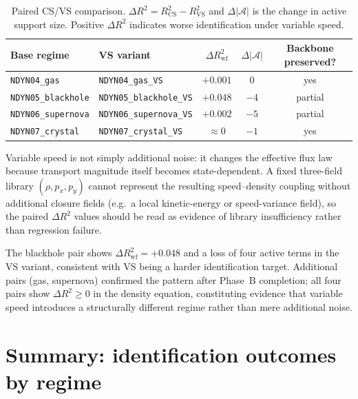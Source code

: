 \begin{table}[ht]
\centering
\caption{Paired CS/VS comparison.  $\Delta R^2 = R^2_{\text{CS}} - R^2_{\text{VS}}$
and $\Delta|\mathcal{A}|$ is the change in active support size.  Positive
$\Delta R^2$ indicates worse identification under variable speed.}
\label{tab:cs_vs_paired}
\renewcommand{\arraystretch}{0.95}
\small
\begin{tabular}{llccc}
\toprule
\textbf{Base regime} & \textbf{VS variant} & $\Delta R^2_{\text{wf}}$ & $\Delta|\mathcal{A}|$ & Backbone preserved? \\
\midrule
\texttt{NDYN04\_gas} & \texttt{NDYN04\_gas\_VS} & $+0.001$ & $0$ & yes \\
\texttt{NDYN05\_blackhole} & \texttt{NDYN05\_blackhole\_VS} & $+0.048$ & $-4$ & partial \\
\texttt{NDYN06\_supernova} & \texttt{NDYN06\_supernova\_VS} & $+0.002$ & $-5$ & partial \\
\texttt{NDYN07\_crystal} & \texttt{NDYN07\_crystal\_VS} & $\approx 0$ & $-1$ & yes \\
\bottomrule
\end{tabular}
\end{table}

Variable speed is not simply additional noise: it changes the effective
flux law because transport magnitude itself becomes state-dependent.
A fixed three-field library $(\rho, p_x, p_y)$ cannot represent the
resulting speed--density coupling without additional closure fields
(e.g.\ a local kinetic-energy or speed-variance field), so the paired
$\Delta R^2$ values should be read as evidence of library insufficiency
rather than regression failure.

The blackhole pair shows
$\Delta R^2_{\text{wf}} = +0.048$ and a loss of four active terms in
the VS variant, consistent with VS being a harder identification target.
Additional pairs (gas, supernova) confirmed the pattern after
Phase~B completion; all four pairs show $\Delta R^2 \geq 0$ in the
density equation, constituting evidence that variable speed
introduces a structurally different regime rather than mere additional
noise.

\section{Summary: identification outcomes by regime}
\label{sec:wsindy_outcomes}

